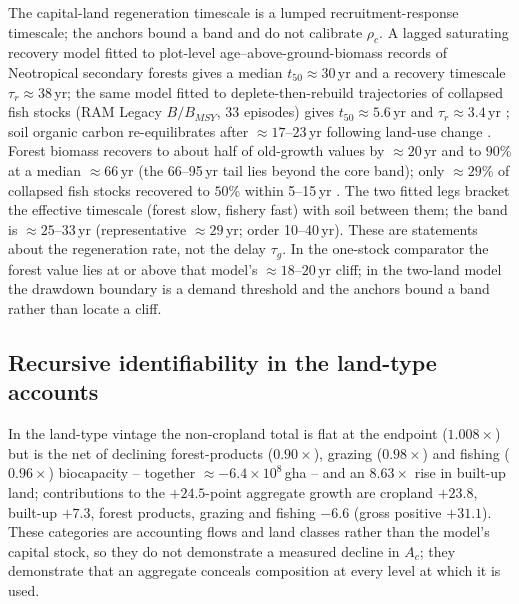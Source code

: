 The capital-land regeneration timescale is a lumped recruitment-response timescale; the anchors bound a band and do not calibrate $\rho_c$. A lagged saturating recovery model fitted to plot-level age--above-ground-biomass records of Neotropical secondary forests \citep[2ndFOR;][1{,}334 plots, 41 chronosequences, 35 good fits]{Poorter2016} gives a median $t_{50}\approx30$\,yr and a recovery timescale $\tau_r\approx38$\,yr; the same model fitted to deplete-then-rebuild trajectories of collapsed fish stocks (RAM Legacy $B/B_{MSY}$, 33 episodes) gives $t_{50}\approx5.6$\,yr and $\tau_r\approx3.4$\,yr \citep[cf.][]{HutchingsReynolds2004,Neubauer2013}; soil organic carbon re-equilibrates after $\approx17$--$23$\,yr following land-use change \citep{Poeplau2011}. Forest biomass recovers to about half of old-growth values by $\approx20$\,yr and to $90\%$ at a median $\approx66$\,yr \citep{Poorter2016} (the 66--95\,yr tail lies beyond the core band); only $\approx29\%$ of collapsed fish stocks recovered to $50\%$ within 5--15\,yr \citep{HutchingsReynolds2004}. The two fitted legs bracket the effective timescale (forest slow, fishery fast) with soil between them; the band is $\approx25$--$33$\,yr (representative $\approx29$\,yr; order 10--40\,yr). These are statements about the regeneration rate, not the delay $\tau_g$. In the one-stock comparator the forest value lies at or above that model's $\approx18$--$20$\,yr cliff; in the two-land model the drawdown boundary is a demand threshold and the anchors bound a band rather than locate a cliff.

\subsection{Recursive identifiability in the land-type accounts}\label{si:recursive}

In the land-type vintage the non-cropland total is flat at the endpoint ($1.008\times$) but is the net of declining forest-products ($0.90\times$), grazing ($0.98\times$) and fishing ($0.96\times$) biocapacity -- together $\approx-6.4\times10^{8}$\,gha -- and an $8.63\times$ rise in built-up land; contributions to the $+24.5$-point aggregate growth are cropland $+23.8$, built-up $+7.3$, forest products, grazing and fishing $-6.6$ (gross positive $+31.1$). These categories are accounting flows and land classes rather than the model's capital stock, so they do not demonstrate a measured decline in $A_c$; they demonstrate that an aggregate conceals composition at every level at which it is used.
